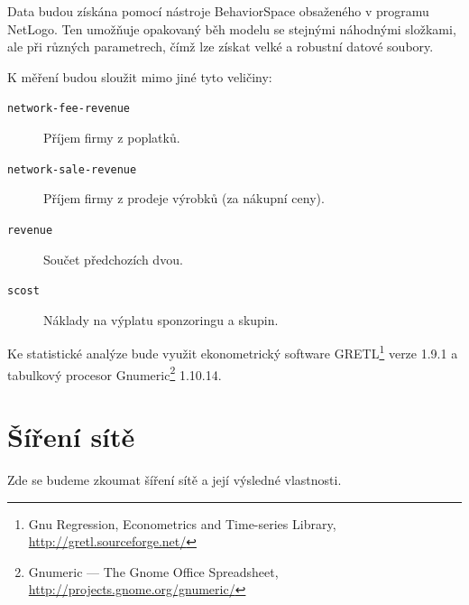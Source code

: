 \documentclass[a4wide,12pt]{report}
\begin{document}
Data budou získána pomocí nástroje BehaviorSpace obsaženého v programu NetLogo. Ten umožňuje opakovaný běh modelu se stejnými náhodnými složkami, ale při různých parametrech, čímž lze získat velké a robustní datové soubory.

K měření budou sloužit mimo jiné tyto veličiny:
\begin{description}
\item[\texttt{network-fee-revenue}] Příjem firmy z poplatků.
\item[\texttt{network-sale-revenue}] Příjem firmy z prodeje výrobků (za nákupní ceny).
\item[\texttt{revenue}] Součet předchozích dvou.
\item[\texttt{scost}] Náklady na výplatu sponzoringu a skupin.
\end{description}
Ke statistické analýze bude využit ekonometrický software GRETL\footnote{Gnu Regression, Econometrics and Time-series Library, \url{http://gretl.sourceforge.net/}} verze 1.9.1 a tabulkový procesor Gnumeric\footnote{Gnumeric --- The Gnome Office Spreadsheet, \url{http://projects.gnome.org/gnumeric/}} 1.10.14.
\section{Šíření sítě}
Zde se budeme zkoumat šíření sítě a její výsledné vlastnosti. 
\end{document}
